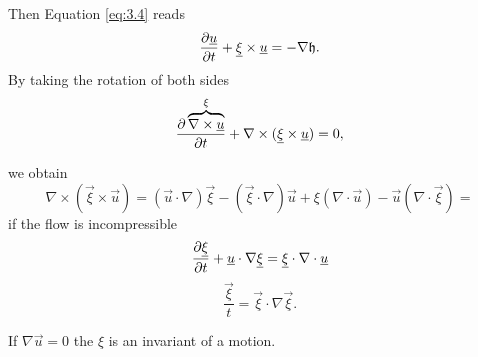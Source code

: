 \documentclass[../main.tex]{subfiles}
\begin{document}
    Then Equation \ref{eq:3.4} reads
    \begin{displaymath}
      \frac{\partial \underline{u}}{\partial t} + \underline{\xi} \times \underline{u} = - \nabla \mathfrak{h}.
    \end{displaymath}
    By taking the rotation of both sides 
    \begin{displaymath}
      \frac{\partial \overbrace{\nabla \times \underline{u}}^{\xi}}{\partial t} + \nabla \times (\underline{\xi} \times \underline{u}) = 0,
    \end{displaymath}

    we obtain
    \begin{displaymath}
      \nabla \times (\vec \xi \times \vec u) = ( \vec u \cdot \nabla) \vec \xi - (\vec \xi \cdot \nabla) \vec u 
      + \xi (\nabla \cdot \vec u) - \vec u (\nabla \cdot \vec \xi)=
    \end{displaymath}
    if the flow is incompressible
    \begin{displaymath}
      \frac{\partial \underline{\xi}}{\partial t} + \underline{u} \cdot \nabla \underline{\xi} = \underline{\xi} \cdot \nabla \cdot \underline{u}
    \end{displaymath}
    \begin{displaymath}
      \dfrac{\vec \xi}{t} = \vec \xi \cdot \nabla \vec \xi.
    \end{displaymath}

    If $\nabla \vec u = 0$ the $\xi $ is an invariant of a motion.
\end{document}
